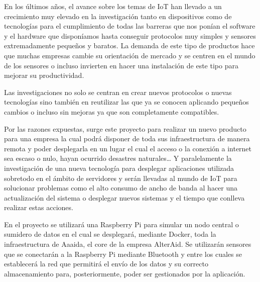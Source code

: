 \documentclass[spanish,final]{setup/eetac_tfc_pfc}
\begin{document}

\beforepreface  


\begin{resum}{10cm}
En los últimos años, el avance sobre los temas de IoT han llevado a un crecimiento muy elevado en la investigación tanto en dispositivos como de tecnologías para el cumplimiento de todas las barreras que nos ponían el software y el hardware que disponíamos hasta conseguir protocolos muy simples y sensores extremadamente pequeños y baratos. La demanda de este tipo de productos hace que muchas empresas cambie su orientación de mercado y se centren en el mundo de los sensores o incluso invierten en hacer una instalación de este tipo para mejorar su productividad.
\newline 

Las investigaciones no solo se centran en crear nuevos protocolos o nuevas tecnologías sino también en reutilizar las que ya se conocen aplicando pequeños cambios o incluso sin mejoras ya que son completamente compatibles.
\newline

Por las razones expuestas, surge este proyecto para realizar un nuevo producto para una empresa la cual podrá disponer de toda sus infraestructura de manera remota y poder desplegarla en un lugar el cual el acceso o la conexión a internet sea escaso o nulo, hayan ocurrido desastres naturales… Y paralelamente la investigación de una nueva tecnología para desplegar aplicaciones utilizada sobretodo en el ámbito de servidores y serán llevadas al mundo de IoT para solucionar problemas como el alto consumo de ancho de banda al hacer una actualización del sistema o desplegar nuevos sistemas y el tiempo que conlleva realizar estas acciones.
\newline

En el proyecto se utilizará una Raspberry Pi para simular un nodo central o sumidero de datos en el cual se desplegará, mediante Docker, toda la infraestructura de Aaaida, el core de la empresa AlterAid. Se utilizarán sensores que se conectarán a la Raspberry Pi mediante Bluetooth y entre los cuales se establecerá la red que permitirá el envío de los datos y su correcto almacenamiento para, posteriormente, poder ser gestionados por la aplicación.

\end{resum}
\end{document}
